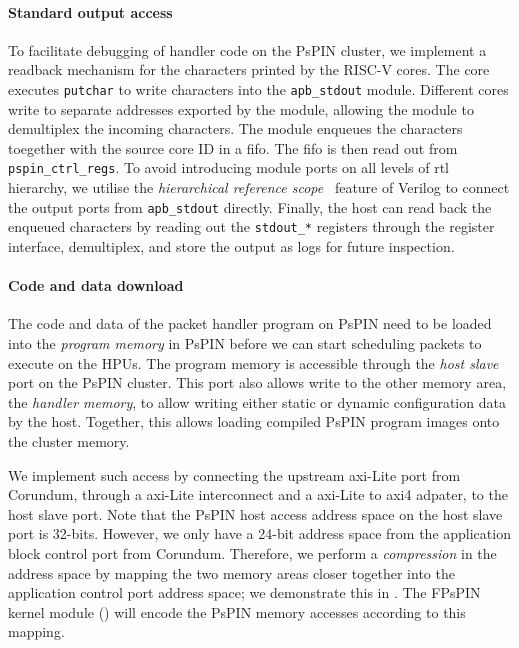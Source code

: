 \paragraph{Standard output access} To facilitate debugging of handler code on the PsPIN cluster, we implement a readback mechanism for the characters printed by the RISC-V cores.  The core executes \texttt{putchar} to write characters into the \texttt{apb\_stdout} module.  Different cores write to separate addresses exported by the module, allowing the module to demultiplex the incoming characters.  The module enqueues the characters toegether with the source core ID in a \ac{fifo}.  The \ac{fifo} is then read out from \texttt{pspin\_ctrl\_regs}.  To avoid introducing module ports on all levels of \ac{rtl} hierarchy, we utilise the \emph{hierarchical reference scope}~\cite{noauthor_verilog_nodate} feature of Verilog to connect the output ports from \texttt{apb\_stdout} directly.  Finally, the host can read back the enqueued characters by reading out the \texttt{stdout\_*} registers through the register interface, demultiplex, and store the output as logs for future inspection.

\paragraph{Code and data download} The code and data of the packet handler program on PsPIN need to be loaded into the \emph{program memory} in PsPIN before we can start scheduling packets to execute on the HPUs.  The program memory is accessible through the \emph{host slave} port on the PsPIN cluster.  This port also allows write to the other memory area, the \emph{handler memory}, to allow writing either static or dynamic configuration data by the host.  Together, this allows loading compiled PsPIN program images onto the cluster memory.

We implement such access by connecting the upstream \ac{axi}-Lite port from Corundum, through a \ac{axi}-Lite interconnect and a \ac{axi}-Lite to \ac{axi}4 adpater, to the host slave port.  Note that the PsPIN host access address space on the host slave port is 32-bits.  However, we only have a 24-bit address space from the application block control port from Corundum.  Therefore, we perform a \emph{compression} in the address space by mapping the two memory areas closer together into the application control port address space; we demonstrate this in .  The FPsPIN kernel module () will encode the PsPIN memory accesses according to this mapping.

